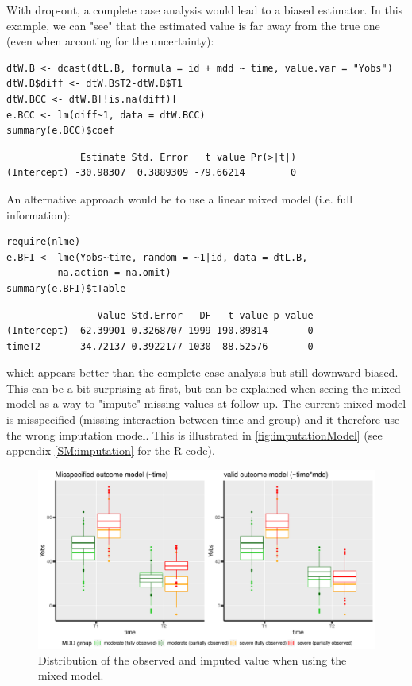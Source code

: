 \documentclass[12pt]{article}
\begin{document}
With drop-out, a complete case analysis would lead to a biased
estimator. In this example, we can "see" that the estimated value is
far away from the true one (even when accouting for the uncertainty):
\lstset{language=r,label= ,caption= ,captionpos=b,numbers=none}
\begin{lstlisting}
dtW.B <- dcast(dtL.B, formula = id + mdd ~ time, value.var = "Yobs")
dtW.B$diff <- dtW.B$T2-dtW.B$T1
dtW.BCC <- dtW.B[!is.na(diff)]
e.BCC <- lm(diff~1, data = dtW.BCC)
summary(e.BCC)$coef
\end{lstlisting}

\begin{verbatim}
             Estimate Std. Error   t value Pr(>|t|)
(Intercept) -30.98307  0.3889309 -79.66214        0
\end{verbatim}


An alternative approach would be to use a linear mixed model
(i.e. full information):
\lstset{language=r,label= ,caption= ,captionpos=b,numbers=none}
\begin{lstlisting}
require(nlme)
e.BFI <- lme(Yobs~time, random = ~1|id, data = dtL.B,
	     na.action = na.omit)
summary(e.BFI)$tTable
\end{lstlisting}

\begin{verbatim}
                Value Std.Error   DF   t-value p-value
(Intercept)  62.39901 0.3268707 1999 190.89814       0
timeT2      -34.72137 0.3922177 1030 -88.52576       0
\end{verbatim}

which appears better than the complete case analysis but still
downward biased. This can be a bit surprising at first, but can be
explained when seeing the mixed model as a way to "impute" missing
values at follow-up. The current mixed model is misspecified (missing
interaction between time and group) and it therefore use the wrong
imputation model. This is illustrated in \autoref{fig:imputationModel}
(see appendix \ref{SM:imputation} for the R code).

\clearpage

\begin{figure}[!h]
\centering
\includegraphics[width=\textwidth]{./figures/gg-imputationModel.pdf}
\caption{\label{fig:imputationModel}Distribution of the observed and imputed value when using the mixed model.}
\end{figure}
\end{document}
